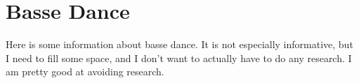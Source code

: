 \documentclass{book}
\begin{document}
\frontmatter


\chapter*{Basse Dance}

\thispagestyle{empty}
Here is some information about basse dance. It is not especially informative, but I need to fill some space, and I don't want to actually have to do any research. I am pretty good at avoiding research.








\end{document}
